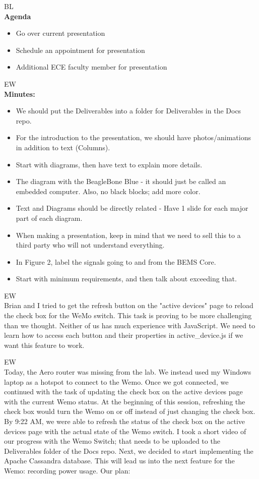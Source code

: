 \documentclass[fontsize=11pt, %
                             paper=letter, %
                             openany, %
                             captions=tableheading,
                             index=totoc,
                             hyperref]{labbook}
\begin{document}
BL\\
\textbf{Agenda}
\begin{itemize}
\item Go over current presentation
\item Schedule an appointment for presentation
\item Additional ECE faculty member for presentation
\end{itemize}

EW\\
\textbf{Minutes:}
\begin{itemize}
\item We should put the Deliverables into a folder for Deliverables in the Docs repo.
\item For the introduction to the presentation, we should have photos/animations in addition to text (Columns).
\item Start with diagrams, then have text to explain more details.
\item The diagram with the BeagleBone Blue - it should just be called an embedded computer. Also, no black blocks; add more color.
\item Text and Diagrams should be directly related - Have 1 slide for each major part of each diagram.
\item When making a presentation, keep in mind that we need to sell this to a third party who will not understand everything.
\item In Figure 2, label the signals going to and from the BEMS Core.
\item Start with minimum requirements, and then talk about exceeding that.
\end{itemize}

EW\\
Brian and I tried to get the refresh button on the "active devices" page to reload the check box for the WeMo switch. This task is proving to be more challenging than we thought. Neither of us has much experience with JavaScript. We need to learn how to access each button and their properties in active\_device.js if we want this feature to work.

EW\\
 Today, the Aero router was missing from the lab. We
instead used my Windows laptop as a hotspot to connect to the Wemo. Once we got
connected, we continued with the task of updating the check box on the active
devices page with the current Wemo status. At the beginning of this session,
refreshing the check box would turn the Wemo on or off instead of just changing
the check box. By 9:22 AM, we were able to refresh the status of the check box
on the active devices page with the actual state of the Wemo switch. I took a
short video of our progress with the Wemo Switch; that needs to be uploaded to
the Deliverables folder of the Docs repo. Next, we decided to start implementing
the Apache Cassandra database. This will lead us into the next feature for the
Wemo: recording power usage. Our plan:
\end{document}
